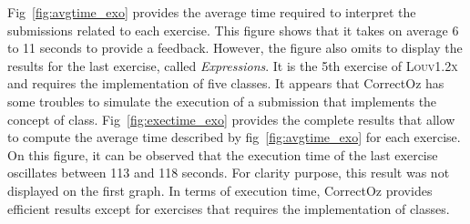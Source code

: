 \documentclass[11pt,a4paper,twoside,openright]{report}
\begin{document}
Fig~\ref{fig:avgtime_exo} provides the average time required to interpret the 
submissions related to each exercise. This figure shows that it takes on average 
6 to 11 seconds to provide a feedback. However, the figure also omits to 
display the results for the last exercise, called 
\textit{Expressions}. It is the 5th exercise of \textsc{Louv1.2x} and requires 
the implementation of five classes. It appears that CorrectOz has some 
troubles to simulate the execution of a submission that implements the 
concept of class. Fig~\ref{fig:exectime_exo} provides the complete results that 
allow to compute the average time described by fig~\ref{fig:avgtime_exo} for 
each exercise. On this figure, it can be observed that the execution time of 
the last exercise oscillates between 113 and 118 seconds. For clarity purpose, 
this result was not displayed on the first graph. In terms of execution time, 
CorrectOz provides efficient results except for exercises that requires the 
implementation of classes.
\end{document}
